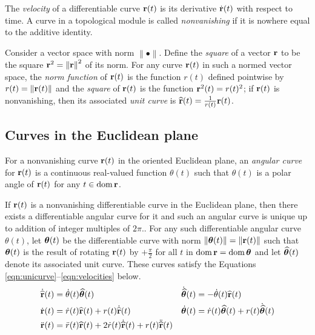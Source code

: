 The \emph{velocity} of a differentiable curve $\mathbf{r}(t)$ is its derivative $\dot{\mathbf{r}}(t)$ with respect to time.
A curve in a topological module is called \emph{nonvanishing} if it is nowhere equal to the additive identity.

Consider a vector space with norm $\left\|\bullet\right\|$.
Define the \emph{square} of a vector $\mathbf{r}$ to be the square $\mathbf{r}^2 = \left\|\mathbf{r}\right\|^2$ of its norm.
For any curve $\mathbf{r}(t)$ in such a normed vector space, the \emph{norm function} of $\mathbf{r}(t)$ is the function $r(t)$ defined pointwise by $r(t) = \left\|\mathbf{r}(t)\right\|$ and the \emph{square} of $\mathbf{r}(t)$ is the function $\mathbf{r}^2(t) = r(t)^2$; if $\mathbf{r}(t)$ is nonvanishing, then its associated \emph{unit curve} is $\widehat{\mathbf{r}}(t) = \frac{1}{r(t)} \mathbf{r}(t)$.

\subsection*{Curves in the Euclidean plane}\label{sec:geo}

For a nonvanishing curve $\mathbf{r}(t)$ in the oriented Euclidean plane, an \emph{angular curve} for $\mathbf{r}(t)$ is a continuous real-valued function $\theta(t)$ such that $\theta(t)$ is a polar angle of $\mathbf{r}(t)$ for any $t \in \operatorname{dom} \mathbf{r}$.

If $\mathbf{r}(t)$ is a nonvanishing differentiable curve in the Euclidean plane, then there exists a differentiable angular curve for it and such an angular curve is unique up to addition of integer multiples of $2 \pi$..
For any such differentiable angular curve $\theta(t)$, let $\bm{\theta}(t)$ be the differentiable curve with norm $\|\bm{\theta}(t)\| = \|\mathbf{r}(t)\|$ such that $\bm{\theta}(t)$ is the result of rotating $\mathbf{r}(t)$ by $+\frac{\pi}{2}$ for all $t$ in $\operatorname{dom} \mathbf{r} = \operatorname{dom} \bm{\theta}$ and let $\widehat{\bm{\theta}}(t)$ denote its associated unit curve.
These curves satisfy the Equations \eqref{eqn:unicurve}--\eqref{eqn:velocities} below.
\begin{align}
	\dot{\widehat{\mathbf{r}}}(t)  & = \dot{\theta}(t) \widehat{\bm{\theta}}(t)
	                        &
	\dot{\widehat{\bm{\theta}}}(t) & = - \dot{\theta}(t) \widehat{\mathbf{r}}(t) \label{eqn:unicurve}                                                                    \\
	\dot{\mathbf{r}}(t)            & = \dot{r}(t) \widehat{\mathbf{r}}(t) + r(t) \dot{\widehat{\mathbf{r}}}(t)
	                        &
	\dot{\bm{\theta}}(t)           & = \dot{r}(t) \widehat{\bm{\theta}}(t) + r(t) \dot{\widehat{\bm{\theta}}}(t) \label{eqn:velocities}                                         \\
	\ddot{\mathbf{r}}(t)           & = \ddot{r}(t) \widehat{\mathbf{r}}(t) + 2 \dot{r}(t) \dot{\widehat{\mathbf{r}}}(t) + r(t) \ddot{\widehat{\mathbf{r}}}(t) \label{eqn:acceleration}
\end{align}

